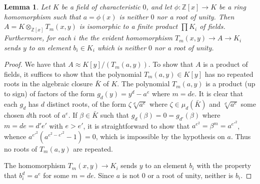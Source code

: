 \documentclass[11pt]{amsart}
\numberwithin{equation}{section}
\theoremstyle{plain}
\newtheorem{lemma}[subsection]{Lemma}
\theoremstyle{remark}
\theoremstyle{plain}
\begin{document}
\begin{lemma}\label{lemma:F_n-usually-has-distinct-roots}
Let $K$ be a field of characteristic $0$, and let $\phi\colon {\mathbb{Z}}[x]{\rightarrow}
K$  be a ring homomorphism such that $a=\phi(x)$ is neither $0$ nor a
root of unity.  Then $A=K\otimes_{{\mathbb{Z}}[x]}T_m(x,y)$ is isomorphic to a
finite product $\prod K_i$ of fields.  Furthermore, for each $i$ the
the evident
homomorphism $T_m(x,y){\rightarrow} A{\rightarrow} K_i$ sends $y$ to an element
$b_i\in K_i$ which is neither $0$ nor a root of unity.
\end{lemma}
\begin{proof}
  We have that $A\approx K[y]/(T_m(a,y))$.  To show that $A$ is a
  product of fields, it suffices to show that
  the polynomial
  $T_m(a,y)\in K[y]$ has no repeated  roots in the algebraic closure $\bar{K}$
  of $K$.  The polynomial $T_m(a,y)$ is a product (up to sign) of
  factors of the form
   $g_d(y)=y^d-a^e$ where $m=de$.  It is clear that each $g_d$ has $d$
   distinct roots, of the form $\zeta \sqrt[d]{a^e}$ where $\zeta\in
   \mu_d(\bar{K})$ and $\sqrt[d]{a^e}$ some chosen $d$th root of
   $a^e$.  If $\beta\in \bar{K}$ such that
   $g_d(\beta)=0=g_{d'}(\beta)$ where $m=de=d'e'$ with $e>e'$, it is
   straightforward to show that $a^{e^2}=\beta^m = a^{{e'}^2}$, whence
   $a^{{e'}^2}(a^{e^2-{e'}^2}-1)=0$, which is impossible by the
   hypothesis on $a$.  Thus no roots of $T_m(a,y)$ are repeated.

   The homomorphism $T_m(x,y){\rightarrow} K_i$ sends $y$ to an element $b_i$ with
   the property that $b_i^{d}=a^e$ for some $m=de$.  Since $a$ is not
   $0$ or a root of unity, neither is $b_i$.
\end{proof}
\end{document}
